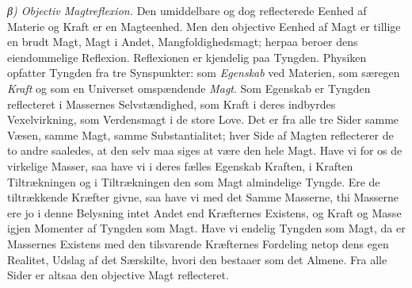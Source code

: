 \documentclass[12pt,a4paper]{book}
\newcommand{\subrunin}[1]{\emph{#1}\hspace{0.4em}}
\begin{document}
\subrunin{β) Objectiv Magtreflexion.} Den umiddelbare og dog
reflecterede Eenhed af Materie og Kraft er en Magteenhed. Men den
objective Eenhed af Magt er tillige en brudt Magt, Magt i Andet,
Mangfoldighedsmagt; herpaa beroer dens eiendommelige Reflexion.
Reflexionen er kjendelig paa Tyngden. Physiken opfatter Tyngden fra tre
Synspunkter: som \emph{Egenskab} ved Materien, som særegen \emph{Kraft}
og som en Universet omspændende \emph{Magt}. Som Egenskab er Tyngden
reflecteret i Massernes Selvstændighed, som Kraft i deres indbyrdes
Vexelvirkning, som Verdensmagt i de store Love. Det er fra alle tre
Sider samme Væsen, samme Magt, samme Substantialitet; hver Side af
Magten reflecterer de to andre saaledes, at den selv maa siges at være
den hele Magt. Have vi for os de virkelige Masser, saa have vi i deres
fælles Egenskab Kraften, i Kraften Tiltrækningen og i Tiltrækningen den
som Magt almindelige Tyngde. Ere de tiltrækkende Kræfter givne, saa
have vi med det Samme
Masserne, thi Masserne ere jo i denne Belysning intet Andet end
Kræfternes Existens, og Kraft og Masse igjen Momenter af Tyngden som
Magt. Have vi endelig Tyngden som Magt, da er Massernes Existens med
den tilsvarende Kræfternes Fordeling netop dens egen Realitet, Udslag af
det Særskilte, hvori den bestaaer som det Almene. Fra alle Sider er
altsaa den objective Magt reflecteret.
\end{document}
